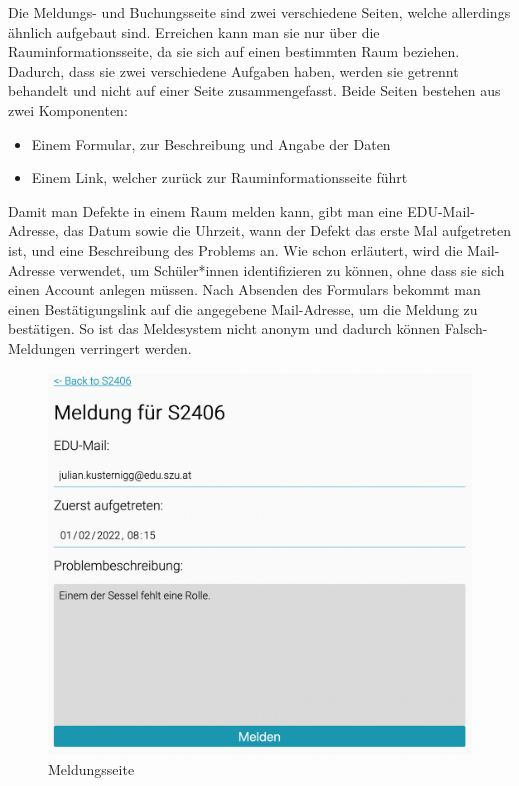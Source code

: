 
Die Meldungs- und Buchungsseite sind zwei verschiedene Seiten, welche allerdings ähnlich aufgebaut sind. Erreichen kann man sie nur über die Rauminformationsseite, da sie sich auf einen bestimmten Raum beziehen. Dadurch, dass sie zwei verschiedene Aufgaben haben, werden sie getrennt behandelt und nicht auf einer Seite zusammengefasst. Beide Seiten bestehen aus zwei Komponenten:
\begin{itemize}
    \item Einem Formular, zur Beschreibung und Angabe der Daten
    \item Einem Link, welcher zurück zur Rauminformationsseite führt
\end{itemize}

Damit man Defekte in einem Raum melden kann, gibt man eine EDU-Mail-Adresse, das Datum sowie die Uhrzeit, wann der Defekt das erste Mal aufgetreten ist, und eine Beschreibung des Problems an. Wie schon erläutert, wird die Mail-Adresse verwendet, um Schüler*innen identifizieren zu können, ohne dass sie sich einen Account anlegen müssen. Nach Absenden des Formulars bekommt man einen Bestätigungslink auf die angegebene Mail-Adresse, um die Meldung zu bestätigen. So ist das Meldesystem nicht anonym und dadurch können Falsch-Meldungen verringert werden.

\begin{figure}[H]
    \centering
    \includegraphics[width=120mm]{media/WebComponents/Meldungsseite_light.png}
    \caption{Meldungsseite}
\end{figure}

